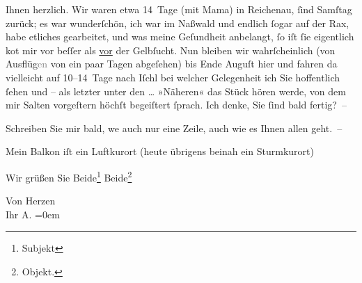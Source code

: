                Ihnen herzlich. Wir waren etwa 14 Tage \introOben{}(\introOben{}mit Mama\introOben{})\introOben{} in Reichenau,{ }ſind
                  Samſtag zurück; es war wunderſchön, {\pb}ich war im Naßwald und endlich{ }ſogar auf der
               Rax, habe etliches gearbeitet, und was meine
               Geſundheit anbelangt,{ }ſo iſt{ }ſie eigentlich ko{\geminationm}t mir vor
               beſſer als \uline{vor} der Gelbſucht. Nun bleiben wir
               wahrſcheinlich (\introOben{}von\introOben{} Ausflüg\textcolor{gray}{en} von ein
               paar Tagen abge{\pb}ſehen) bis Ende Auguſt
               hier und fahren da{\geminationn} vielleicht auf 10–14 Tage nach Iſchl bei welcher Gelegenheit ich Sie hoffentlich{ }ſehen und – als letzter unter den {\dots} »Näheren« das Stück hören werde, von dem mir
                  Salten vorgeſtern höchſt begeiſtert{ }ſprach.
               Ich denke, {\pb}Sie{ }ſind bald fertig? –\pend
           
\pstart
           Schreiben Sie mir bald, we{\geminationn} auch nur eine Zeile, auch
               wie es Ihnen allen geht. –\pend
           
\pstart
           Mein Balkon iſt ein Luftkurort (heute übrigens beinah ein Sturmkurort)\pend
           
\pstart
           Wir grüßen Sie Beide\footnote{\noindent{}Subjekt} Beide\footnote{\noindent{}Objekt.}\pend
           
\pstart
           Von Herzen{\\[\baselineskip]}Ihr \spacefill\mbox{A.}\pend
           \leftskip=0em{}\endnumbering{}  \newcommand{\dateiname}{L01420}\newcommand{\titel}{Arthur Schnitzler an Richard Beer-Hofmann, 28. 7. 1904}\newcommand{\editorInnen}{Martin Anton Müller und Gerd-Hermann Susen}
